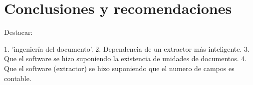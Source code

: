 \chapter*{Conclusiones y recomendaciones} \label{chap:conclusiones}

Destacar:

1.  'ingeniería del documento'. 
2. Dependencia de un extractor más inteligente.
3. Que el software se hizo suponiendo la existencia de unidades de documentos. 
4. Que el software (extractor) se hizo suponiendo que el numero de campos es contable.